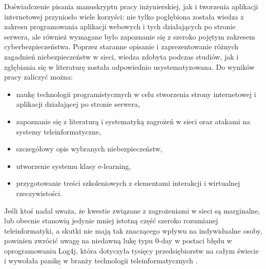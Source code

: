 \documentclass[12pt,twoside]{article}
\begin{document}
Doświadczenie pisania manuskryptu pracy inżynierskiej, jak i tworzenia aplikacji internetowej przyniosło wiele korzyści: nie tylko pogłębiona została wiedza z zakresu programowania aplikacji webowych i tych działających po stronie serwera, ale również wymagane było zapoznanie się z szeroko pojętym zakresem cyberbezpieczeństwa. Poprzez staranne opisanie i zaprezentowanie różnych zagadnień niebezpieczeństw w sieci, wiedza zdobyta podczas studiów, jak i zgłębiania się w literaturę została odpowiednio usystematyzowana. Do wyników pracy zaliczyć można:
\begin{itemize}

\item naukę technologii programistycznych w celu stworzenia strony internetowej i aplikacji działającej po stronie serwera,
\item zapoznanie się z literaturą i systematyką zagrożeń w sieci oraz atakami na systemy teleinformatyczne,
\item szczegółowy opis wybranych niebezpieczeństw,
\item utworzenie systemu klasy e-learning,
\item przygotowanie treści szkoleniowych z elementami interakcji i wirtualnej rzeczywistości.
\end{itemize}
Jeśli ktoś nadal uważa, że kwestie związane z zagrożeniami w sieci są marginalne, lub obecnie stanowią jedynie mniej istotną część szeroko rozumianej teleinformatyki, a skutki nie mają tak znaczącego wpływu na indywidualne osoby, powinien zwrócić uwagę na niedawną lukę typu 0-day w postaci błędu w oprogramowaniu Log4j, która dotyczyła tysięcy przedsiębiorstw na całym świecie i wywołała panikę w branży technologii teleinformatycznych \cite{Log4j}.

\clearpage

\end{document}
